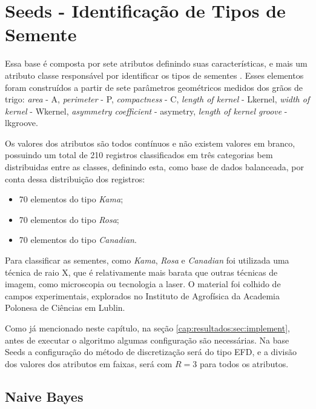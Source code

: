 \section{Seeds - Identificação de Tipos de Semente}
Essa base é composta por sete  atributos definindo suas características, e mais um atributo classe  responsável por identificar os tipos de sementes \cite{Charytanowicz2010}. Esses elementos foram construídos a partir de sete parâmetros geométricos medidos dos grãos de trigo: \textit{area} - A, \textit{perimeter} - P, \textit{compactness} - C, \textit{length of kernel} - Lkernel, \textit{width of kernel} - Wkernel, \textit{asymmetry coefficient} - asymetry, \textit{length of kernel groove} - lkgroove.

Os valores dos atributos  são todos contínuos e não existem valores em branco,  possuindo um total de 210 registros classificados em três categorias bem distribuidas entre as classes, definindo esta, como base de dados balanceada, por conta dessa distribuição dos registros:
\begin{itemize}[noitemsep]
 \item 70 elementos do tipo \textit{Kama};
 \item 70 elementos do tipo \textit{Rosa};
 \item 70 elementos do tipo \textit{Canadian}.
\end{itemize}
Para classificar as sementes, como \textit{Kama}, \textit{Rosa} e \textit{Canadian} foi utilizada uma técnica de raio X, que é relativamente mais barata que outras técnicas de imagem, como microscopia ou tecnologia a laser. O material foi colhido de campos experimentais, explorados no Instituto de Agrofísica da Academia Polonesa de Ciências em Lublin.

Como já mencionado neste capítulo, na seção \ref{cap:resultados:sec:implement}, antes de executar o algoritmo algumas configuração são necessárias. Na base Seeds  a configuração do método de discretização será do tipo EFD, e a divisão dos valores dos atributos em faixas, será com ${R=3}$ para todos os atributos. 



\subsection{Naive Bayes} \label{cap:resultados:ssec:seed:nb}



